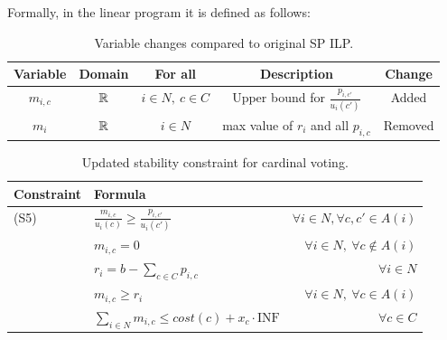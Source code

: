Formally, in the linear program it is defined as follows:
\begin{table}[H]
\renewcommand{\arraystretch}{1.5}
    \centering
    \begin{tabular}{c|c|c|c|c}
    \hline
    \textbf{Variable} & \textbf{Domain} & \textbf{For all} & \textbf{Description} & \textbf{Change} \\
    \hline    
         $m_{i,c}$ & $\mathbb{R}$ & $i \in N, \ c \in C$ & Upper bound for $\frac{p_{i,c'}}{u_i(c')}$ & Added \\
         $m_i$ & $\mathbb{R}$ & $i\in N$ & max value of $r_i$ and all $p_{i,c}$ & Removed\\

    \end{tabular}
    \caption{Variable changes compared to original SP ILP.}
    \label{tab:my_label}
\end{table}

\begin{table}[H]
\renewcommand{\arraystretch}{1.5}
\centering
\begin{tabular}{l|l r}
\textbf{Constraint} & \textbf{Formula} & \textbf{} \\
\hline
(S5) & $\frac{m_{i,c}}{u_i(c)}\ge \frac{p_{i,c'}}{u_i(c')}$ & $\forall i \in N, \forall c,c' \in A(i)$ \\
 & $m_{i,c} = 0$ & $\forall i \in N, \ \forall c \notin A(i)$ \\
 & $r_i=b-\sum_{c\in C}p_{i,c}$ & $\forall i \in N$ \\
 & $m_{i,c}\ge r_i$ & $\forall i \in N, \ \forall c \in A(i)$\\
 & $\sum_{i\in N}m_{i,c}\le cost(c) + x_c\cdot \text{INF}$ & $\forall c \in C$ \\
\end{tabular}
\caption{Updated stability constraint for cardinal voting.}
\end{table}
\leavevmode\\
